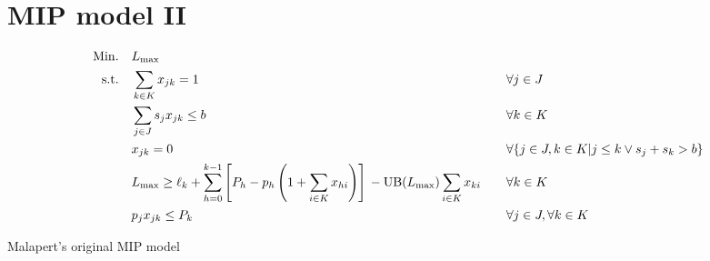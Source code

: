 \section{MIP model II}\label{sec:koschmipmodel}
\begin{model}[h]
\begin{alignat}{2}
\mathrm{Min.}\quad & \Lmax && \\
\mathrm{s.t.}\quad &\sum_{k \in K} x_{jk} = 1 \quad && \forall j \in J \\
  &\sum_{j \in J} s_j x_{jk} \leq b \quad && \forall k \in K\\
  &x_{jk} = 0 \quad && \forall \{ j \in J, k \in K | j \leq k \lor s_j + s_k > b
  \} \\
  &\Lmax \geq \ell_k + \sum_{h=0}^{k-1} \left[ P_h - p_h \left(1+\sum_{i \in K}
  x_{hi} \right) \right] \newline - \mathrm{UB}(\Lmax) \sum_{i \in K} x_{ki} \quad && \forall k
  \in K \\
  &p_j x_{jk} \leq P_k \quad && \forall j \in J, \forall k \in K\\
\end{alignat}
\caption{Malapert's original MIP model}
\label{model:malapertmip}
\end{model}

